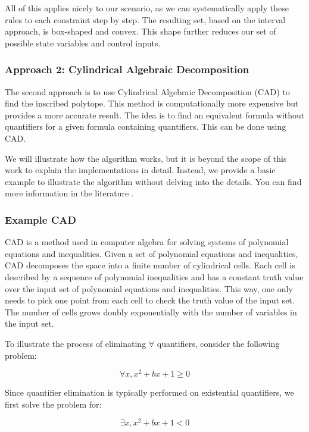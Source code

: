 All of this applies nicely to our scenario, as we can systematically apply these rules to each constraint step by step.
The resulting set, based on the interval approach, is box-shaped and convex.
This shape further reduces our set of possible state variables and control inputs.

\subsubsection{Approach 2: Cylindrical Algebraic Decomposition} \label{subsubsec:cad}

The second approach is to use Cylindrical Algebraic Decomposition (CAD) to find the inscribed polytope.
This method is computationally more expensive but provides a more accurate result.
The idea is to find an equivalent formula without quantifiers for a given formula containing quantifiers.
This can be done using CAD.

We will illustrate how the algorithm works, but it is beyond the scope of this work to explain the implementations in detail.
Instead, we provide a basic example to illustrate the algorithm without delving into the details.
You can find more information in the literature \cite{caviness_quantifier_1998, england_cylindrical_2020}.

\subsubsection{Example CAD}

CAD is a method used in computer algebra for solving systems of polynomial equations and inequalities.
Given a set of polynomial equations and inequalities, CAD decomposes the space into a finite number of cylindrical cells.
Each cell is described by a sequence of polynomial inequalities and has a constant truth value over the input set of polynomial equations and
inequalities.
This way, one only needs to pick one point from each cell to check the truth value of the input set.
The number of cells grows doubly exponentially with the number of variables in the input set.

To illustrate the process of eliminating $\forall$ quantifiers, consider the following problem:

\[ \forall x, x^2 + bx + 1 \geq 0
\]

Since quantifier elimination is typically performed on existential quantifiers, we first solve the problem for:

\[ \exists x, x^2 + bx + 1 < 0 \]

